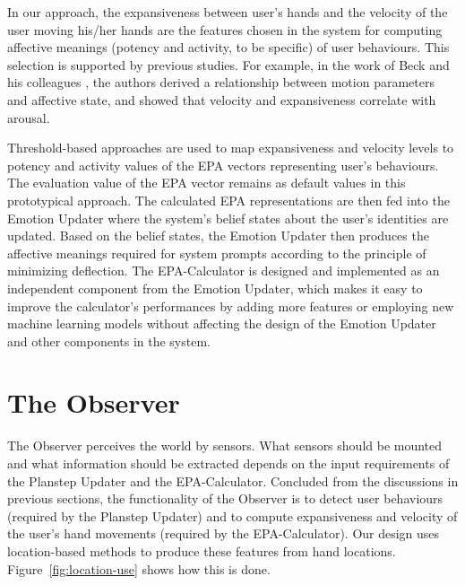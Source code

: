 In our approach, the expansiveness between user's hands and the velocity of the user moving his/her hands are the features chosen in the system for computing affective meanings (potency and activity, to be specific) of user behaviours. This selection is supported by previous studies. For example, in the work of Beck and his colleagues \cite{beck2010interpretation}, the authors derived a relationship between motion parameters and affective state, and showed that velocity and expansiveness correlate with arousal.

Threshold-based approaches are used to map expansiveness and velocity levels to potency and activity values of the EPA vectors representing user's behaviours. The evaluation value of the EPA vector remains as default values in this prototypical approach. The calculated EPA representations are then fed into the Emotion Updater where the system's belief states about the user's identities are updated. Based on the belief states, the Emotion Updater then produces the affective meanings required for system prompts according to the principle of minimizing deflection. The EPA-Calculator is designed and implemented as an independent component from the Emotion Updater, which makes it easy to improve the calculator's performances by adding more features or employing new machine learning models without affecting the design of the Emotion Updater and other components in the system.

\section{The Observer}

The Observer perceives the world by sensors. What sensors should be mounted and what information should be extracted depends on the input requirements of the Planstep Updater and the EPA-Calculator. Concluded from the discussions in previous sections, the functionality of the Observer is to detect user behaviours (required by the Planstep Updater) and to compute expansiveness and velocity of the user's hand movements (required by the EPA-Calculator). Our design uses location-based methods to produce these features from hand locations. Figure~\ref{fig:location-use} shows how this is done.

